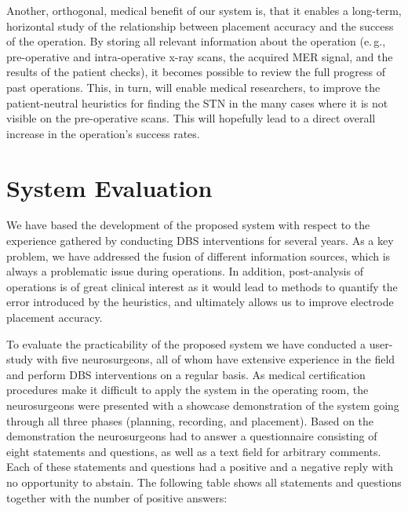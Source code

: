 \documentclass{egpubl}
\begin{document}
Another, orthogonal, medical benefit of our system is, that it enables a long-term, horizontal study of the relationship between placement accuracy and the success of the operation. By storing all relevant information about the operation (e.\,g., pre-operative and intra-operative x-ray scans, the acquired MER signal, and the results of the patient checks), it becomes possible to review the full progress of past operations. This, in turn, will enable medical researchers, to improve the patient-neutral heuristics for finding the STN in the many cases where it is not visible on the pre-operative scans. This will hopefully lead to a direct overall increase in the operation's success rates.




\section{System Evaluation}\label{sec:evaluation}
We have based the development of the proposed system with respect to the experience gathered by conducting DBS interventions for several years. As a key problem, we have addressed the fusion of different information sources, which is always a problematic issue during operations. In addition, post-analysis of operations is of great clinical interest as it would lead to methods to quantify the error introduced by the heuristics, and ultimately allows us to improve electrode placement accuracy.

To evaluate the practicability of the proposed system we have conducted a user-study with five neurosurgeons, all of whom have extensive experience in the field and perform DBS interventions on a regular basis. As medical certification procedures make it difficult to apply the system in the operating room, the neurosurgeons were presented with a showcase demonstration of the system going through all three phases (planning, recording, and placement). Based on the demonstration the neurosurgeons had to answer a questionnaire consisting of eight statements and questions, as well as a text field for arbitrary comments. Each of these statements and questions had a positive and a negative reply with no opportunity to abstain. The following table shows all statements and questions together with the number of positive answers:
\end{document}
